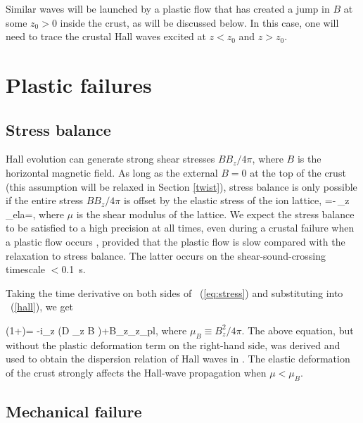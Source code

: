 Similar waves will be launched by a plastic flow that has created a jump in $B$ at 
some $z_0>0$ inside the crust, as will be discussed below. In this case, one will need to 
trace the crustal Hall waves excited at $z<z_0$ and $z>z_0$.

\section{Plastic failures}\label{plastic}

\subsection{Stress balance}

Hall evolution can generate strong shear stresses $BB_z/4\pi$, where 
$B$ is the horizontal magnetic field.
As long as the external $B=0$ at the top of the crust (this assumption will be relaxed in 
Section \ref{twist}), stress balance is only possible 
if the entire stress $BB_z/4\pi$ is offset by the elastic stress of the ion lattice,
\beq
\label{eq:stress}
   =-\mu\,\partial_z \xi_{\rm ela}=\sigma,
\eeq
where $\mu$ is the shear modulus of the lattice. We expect the stress balance 
to be satisfied to a high precision at all times, even during a crustal failure when a plastic flow occurs \citep{2014ApJ...794L..24B}, provided that the plastic flow is slow compared with the relaxation to stress balance. The latter occurs on the shear-sound-crossing timescale $<$0.1~s. 

Taking the time derivative on both sides 
of \Eq~(\ref{eq:stress}) and substituting
into \Eq~(\ref{hall}), we get
 
\beq
\label{eq:evol}
\left(1+\right)= -i\partial_z \left(D {\partial_z B} \right)+B_z\partial_z\dot{\xi}_{\rm pl},
\eeq
where $\mu_B\equiv B_z^2/4\pi$.
The above equation,
but without the plastic deformation term on the right-hand side, was derived 
and used to obtain the dispersion relation of  
Hall waves in \citet{2004ApJ...609..999C}. The elastic deformation of the crust strongly affects the Hall-wave propagation when $\mu<\mu_B$.

\subsection{Mechanical failure}\label{mechanical}


